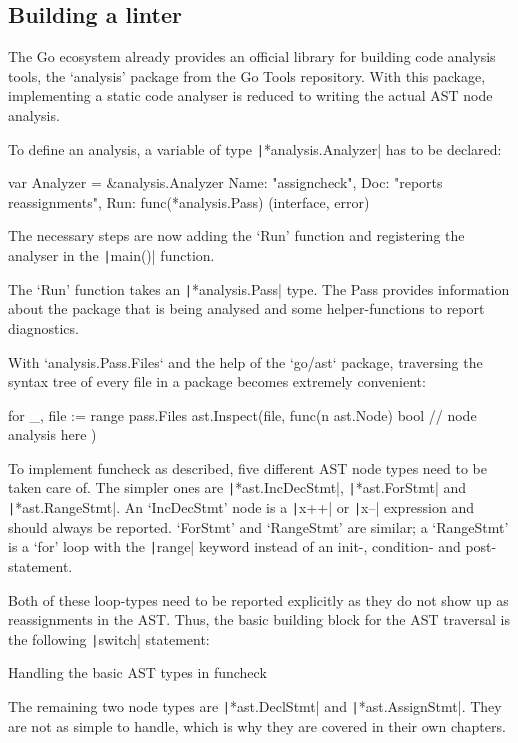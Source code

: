 \subsection{Building a linter}

The Go ecosystem already provides an official library for building code analysis tools,
the `analysis' package from the Go Tools repository\autocite{go-analysis}. With this package,
implementing a static code analyser is reduced to writing the actual AST node analysis.

To define an analysis, a variable of type \texttt|*analysis.Analyzer| has to be declared:

\begin{gocode}
var Analyzer = &analysis.Analyzer{
	Name: "assigncheck",
	Doc:  "reports reassignments",
	Run:  func(*analysis.Pass) (interface{}, error)
}
\end{gocode}

The necessary steps are now adding the `Run' function and registering the analyser
in the \texttt|main()| function.

The `Run' function takes an \texttt|*analysis.Pass| type. The Pass provides
information about the package that is being analysed and some helper-functions to report
diagnostics.

With `analysis.Pass.Files` and the help of the `go/ast` package, traversing the syntax
tree of every file in a package becomes extremely convenient:

\begin{gocode}
for _, file := range pass.Files {
	ast.Inspect(file, func(n ast.Node) bool {
		// node analysis here
	})
}
\end{gocode}

To implement funcheck as described, five different AST node types need to be
taken care of. The simpler ones are
\texttt|*ast.IncDecStmt|, \texttt|*ast.ForStmt| and \texttt|*ast.RangeStmt|.
An `IncDecStmt' node is a \texttt|x++| or \texttt|x--|
expression and should always be reported.
`ForStmt' and `RangeStmt' are similar; a `RangeStmt' is a `for' loop with the
\texttt|range| keyword instead of an init-, condition- and post-statement.

Both of these loop-types need to be reported explicitly as they do not show up
as reassignments in the AST.
Thus, the basic building block for the AST traversal is the following \texttt|switch|
statement:
\begin{code}
	\caption{Handling the basic AST types in funcheck\autocite{funcheck-ast-types}}
\end{code}
The remaining two node types are \texttt|*ast.DeclStmt| and \texttt|*ast.AssignStmt|.
They are not as simple to handle, which is why they are covered in their own chapters.

